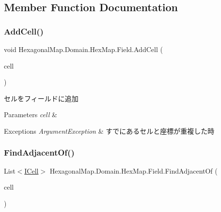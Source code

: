 \subsection{Member Function Documentation}
\mbox{\label{class_hexagonal_map_1_1_domain_1_1_hex_map_1_1_field_ab022ecaed4c11eb5f1d06a77f2f3cd9f}} 
\subsubsection{\texorpdfstring{Add\+Cell()}{AddCell()}}
{\footnotesize\ttfamily void Hexagonal\+Map.\+Domain.\+Hex\+Map.\+Field.\+Add\+Cell (\begin{DoxyParamCaption}\item[{\mbox{\hyperlink{interface_hexagonal_map_1_1_domain_1_1_hex_map_1_1_i_cell}{I\+Cell}}}]{cell }\end{DoxyParamCaption})\hspace{0.3cm}{\ttfamily [inline]}}



セルをフィールドに追加 


\begin{DoxyParams}{Parameters}
{\em cell} & \\
\hline
\end{DoxyParams}

\begin{DoxyExceptions}{Exceptions}
{\em Argument\+Exception} & すでにあるセルと座標が重複した時\\
\hline
\end{DoxyExceptions}
\mbox{\label{class_hexagonal_map_1_1_domain_1_1_hex_map_1_1_field_afce23434d637e17aaef285c5b4b9440b}} 
\subsubsection{\texorpdfstring{Find\+Adjacent\+Of()}{FindAdjacentOf()}}
{\footnotesize\ttfamily List$<$\mbox{\hyperlink{interface_hexagonal_map_1_1_domain_1_1_hex_map_1_1_i_cell}{I\+Cell}}$>$ Hexagonal\+Map.\+Domain.\+Hex\+Map.\+Field.\+Find\+Adjacent\+Of (\begin{DoxyParamCaption}\item[{\mbox{\hyperlink{interface_hexagonal_map_1_1_domain_1_1_hex_map_1_1_i_cell}{I\+Cell}}}]{cell }\end{DoxyParamCaption})\hspace{0.3cm}{\ttfamily [inline]}}



